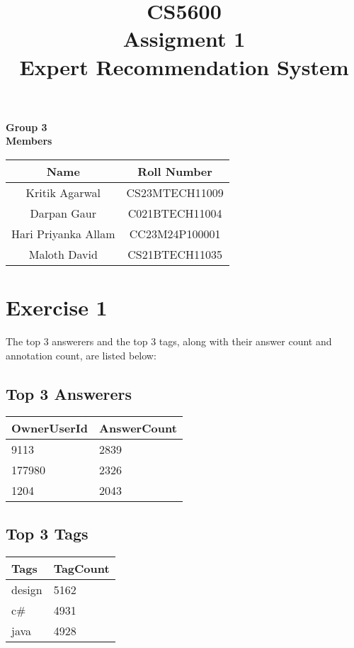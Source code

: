 \documentclass[12pt]{article}
\title{\textbf{\Huge CS5600 \\ Assigment 1 } \\ \textbf{Expert Recommendation System}}
\author{}
\date{}
\begin{document}
\maketitle

\begin{center}
    \textbf{\Large Group 3} \\
    \textbf{\large Members} \\
\end{center} 

\begin{center}
\begin{tabular}{ |c|c| }
\hline
\textbf{Name} & \textbf{Roll Number}  \\
\hline
\hline
Kritik Agarwal  & CS23MTECH11009 \\
\hline
Darpan Gaur  & C021BTECH11004  \\
\hline
Hari Priyanka Allam & CC23M24P100001 \\
\hline
Maloth David  &  	CS21BTECH11035  \\
\hline
\end{tabular}
\end{center}

\newpage

\section*{Exercise 1}
The top 3 answerers and the top 3 tags, along with their answer count and annotation count, are listed below:

\subsection*{Top 3 Answerers}
\begin{center}
\begin{tabular}{ |p{4cm}|p{4cm}| }
\hline
\textbf{OwnerUserId} & \textbf{AnswerCount} \\
\hline
9113   & 2839 \\
\hline
177980 & 2326 \\
\hline
1204   & 2043 \\
\hline
\end{tabular}
\end{center}

\subsection*{Top 3 Tags}
\begin{center}
\begin{tabular}{ |p{4cm}|p{4cm}| }
\hline
\textbf{Tags} & \textbf{TagCount} \\
\hline
design & 5162 \\
\hline
c\#    & 4931 \\
\hline
java   & 4928 \\
\hline
\end{tabular}
\end{center}
\end{document}
